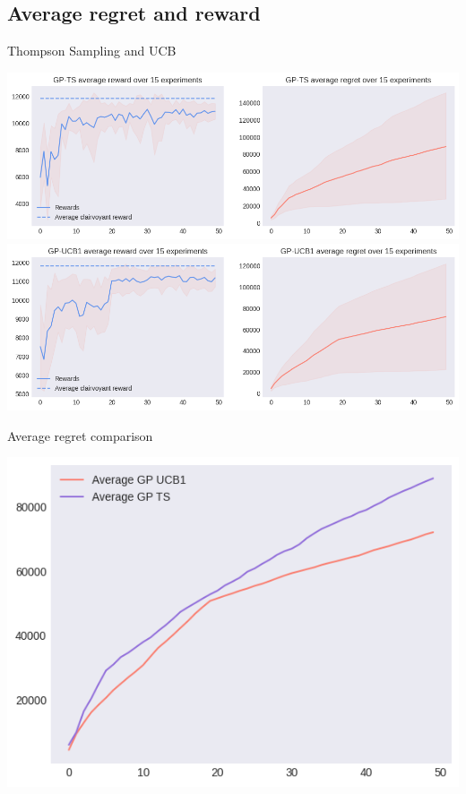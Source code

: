 \clearpage %

\subsection{Average regret and reward}

\vspace*{1em} %

Thompson Sampling and UCB

\begin{center}
	\includegraphics[scale=0.5]{img/Graphs/uncertain_alpha_unit/image4.png}
	\includegraphics[scale=0.5]{img/Graphs/uncertain_alpha_unit/image5.png}
\end{center}

Average regret comparison

\begin{center}
	\includegraphics[scale=0.5]{img/Graphs/uncertain_alpha_unit/image6.png}
\end{center}

